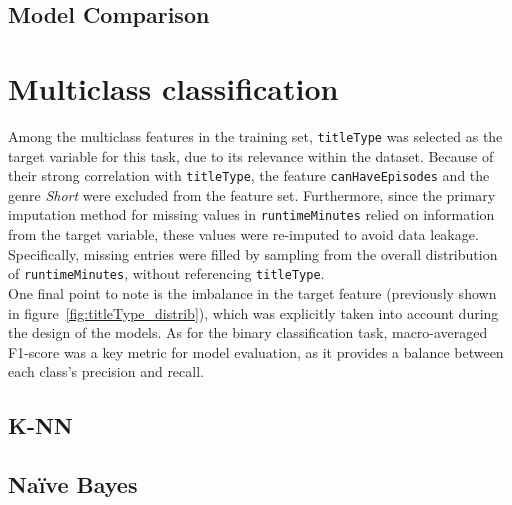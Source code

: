 \subsection{Model Comparison}

\section{Multiclass classification}\label{sec:multiclass_classification}
Among the multiclass features in the training set, \texttt{titleType} was selected as the target variable
for this task, due to its relevance within the dataset. Because of their strong correlation with
\texttt{titleType}, the feature \texttt{canHaveEpisodes} and the genre \textit{Short} were excluded from the
feature set. Furthermore, since the primary imputation method for missing values in \texttt{runtimeMinutes}
relied on information from the target variable, these values were re-imputed to avoid data leakage.
Specifically, missing entries were filled by sampling from the overall distribution of
\texttt{runtimeMinutes}, without referencing \texttt{titleType}.\\

One final point to note is the imbalance in the target feature (previously shown in
figure~\ref{fig:titleType_distrib}), which was explicitly taken into account
during the design of the models. As for the binary classification task, macro-averaged F1-score was
a key metric for model evaluation, as it provides a balance between each class's precision and recall.



\subsection{K-NN}
\subsection{Naïve Bayes}
